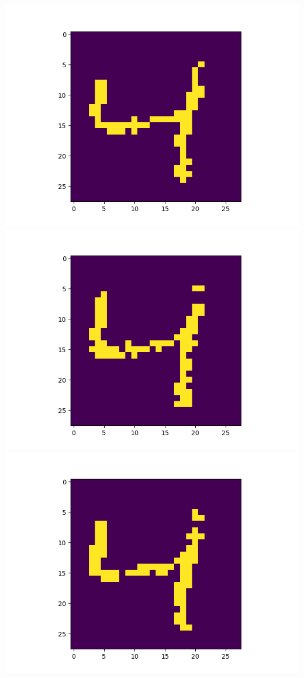 \includegraphics[scale=0.2]{./bilder/comparison/prob/43}
\includegraphics[scale=0.2]{./bilder/comparison/prob/44}
\includegraphics[scale=0.2]{./bilder/comparison/prob/45}
